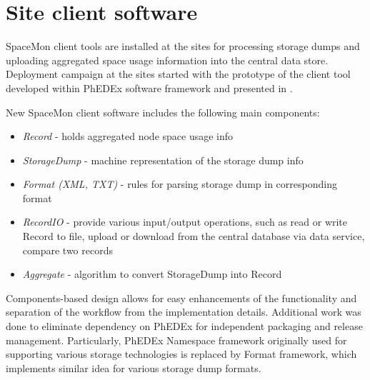 \section {Site client software}

SpaceMon client tools are installed at the sites for processing storage dumps and uploading aggregated
space usage information into the central data store.  Deployment campaign at the sites started with 
the prototype of the client tool developed within PhEDEx software framework \cite{phedexframework} and 
presented in \cite{spacemon}. 

New SpaceMon client software includes the following main components: 
 \begin{itemize}
\item {\it Record} -  holds aggregated node space usage info 
\item {\it StorageDump} - machine representation of the storage dump info
\item {\it Format (XML, TXT) } - rules for parsing storage dump in corresponding format
\item {\it RecordIO } - provide various input/output operations, such as read or write Record to file, upload or download from the central database via data service, compare two records
\item {\it Aggregate } - algorithm to convert StorageDump into Record   
 \end{itemize}

Components-based design allows for easy enhancements of the functionality and separation of the workflow
from the implementation details. 
Additional work was done to eliminate dependency on PhEDEx for independent packaging and release management. 
Particularly, PhEDEx Namespace framework originally used for supporting various storage technologies is replaced
by Format framework, which implements similar idea for various storage dump formats.
